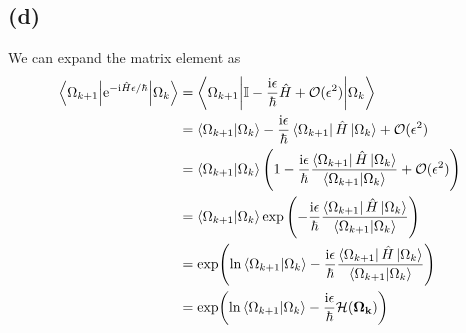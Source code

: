 \documentclass{article}
\newcommand{\ii}{\mathrm{i}}
\newcommand{\me}{\mathrm{e}}
\begin{document}
\subsection*{(d)}
We can expand the matrix element as
\begin{equation}
    \begin{split}
        \mel**{\Omega_{k+1}}{\me^{-\ii \hat{H}\epsilon/\hbar}}{\Omega_k}&=\mel**{\Omega_{k+1}}{\mathbb{I}-\frac{\ii \epsilon}{\hbar}\hat{H}+\mathcal{O}(\epsilon^2)}{\Omega_k}\\
        &=\bra{\Omega_{k+1}}\ket{\Omega_k}-\frac{\ii \epsilon}{\hbar}\bra{\Omega_{k+1}}\hat{H}\ket{\Omega_k}+\mathcal{O}(\epsilon^2)\\
        &=\bra{\Omega_{k+1}}\ket{\Omega_k}\left(1-\frac{\ii \epsilon}{\hbar}\frac{\bra{\Omega_{k+1}}\hat{H}\ket{\Omega_k}}{\bra{\Omega_{k+1}}\ket{\Omega_k}}+\mathcal{O}(\epsilon^2)\right)\\
        &=\bra{\Omega_{k+1}}\ket{\Omega_k}\exp\left(-\frac{\ii \epsilon}{\hbar}\frac{\bra{\Omega_{k+1}}\hat{H}\ket{\Omega_k}}{\bra{\Omega_{k+1}}\ket{\Omega_k}}\right)\\
        &=\exp(\ln{\bra{\Omega_{k+1}}\ket{\Omega_k}}-\frac{\ii \epsilon}{\hbar}\frac{\bra{\Omega_{k+1}}\hat{H}\ket{\Omega_k}}{\bra{\Omega_{k+1}}\ket{\Omega_k}})\\
        &=\exp(\ln{\bra{\Omega_{k+1}}\ket{\Omega_k}}-\frac{\ii\epsilon}{\hbar}\mathcal{H}(\vb{\Omega_k}))
    \end{split}
\end{equation}
\end{document}
